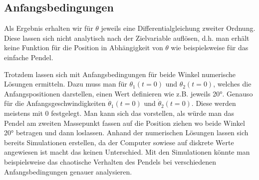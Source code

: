 \subsection{Anfangsbedingungen}
Als Ergebnis erhalten wir für \(\theta\) jeweils eine Differentialgleichung zweiter Ordnung.
Diese lassen sich nicht analytisch nach der Zielvariable auflösen,
d.h. man erhält keine Funktion für die Position in Abhängigkeit von \(\theta\) 
wie beispielsweise für das einfache Pendel. 

Trotzdem lassen sich mit Anfangsbedingungen für beide Winkel numerische Lösungen ermitteln.
Dazu muss man für \(\theta_1(t=0)\) und \(\theta_2(t=0)\), welches die Anfangspositionen darstellen,
einen Wert definieren wie z.B. jeweils 20°. Genauso für die Anfangsgeschwindigkeiten \(\dot{\theta}_1(t=0)\)
und \(\dot{\theta}_2(t=0)\).
Diese werden meistens mit 0 festgelegt. Man kann sich das vorstellen, als würde man das Pendel
am zweiten Massepunkt fassen auf die Position ziehen wo beide Winkel 20° betragen und dann loslassen.
Anhand der numerischen Lösungen lassen sich bereits Simulationen erstellen, da der Computer
sowiese auf diskrete Werte angewiesen ist macht das keinen Unterschied.
Mit den Simulationen könnte man beispielsweise das chaotische Verhalten des Pendels bei verschiedenen 
Anfangsbedingungen genauer analysieren.

